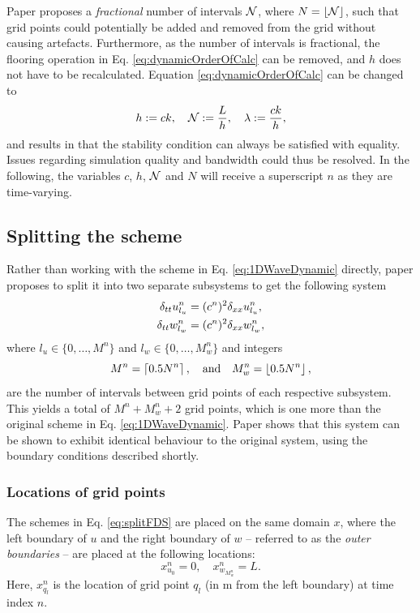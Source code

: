 Paper \citeP[G] proposes a \textit{fractional} number of intervals $\mathcal{N}$, where $N = \floor[\Nfrac]$, such that grid points could potentially be added and removed from the grid without causing artefacts. Furthermore, as the number of intervals is fractional, the flooring operation in Eq. \eqref{eq:dynamicOrderOfCalc} can be removed, and $h$ does not have to be recalculated. Equation \eqref{eq:dynamicOrderOfCalc} can be changed to
\begin{equation}\label{eq:newOrderOfCalc}
    h:= ck, \quad \mathcal{N} := \frac{L}{h}, \quad \lambda := \frac{ck}{h},
\end{equation}  
and results in that the stability condition can always be satisfied with equality. Issues regarding simulation quality and bandwidth could thus be resolved. In the following, the variables $c$, $h$, $\mathcal{N}$ and $N$ will receive a superscript $n$ as they are time-varying.

\subsection{Splitting the scheme}
Rather than working with the scheme in Eq. \eqref{eq:1DWaveDynamic} directly, paper \citeP[G] proposes to split it into two separate subsystems to get the following system 
\begin{subequations}\label{eq:splitFDS}
    \begin{align}
        \delta_{tt} u_{l_u}^n &= (c^n)^2\delta_{xx} u_{l_u}^n,\\
        \delta_{tt} w_{l_w}^n &= (c^n)^2\delta_{xx} w_{l_w}^n,
    \end{align}
\end{subequations}
where $l_u \in \{0, \hdots, M^n\}$ and $l_w \in \{0, \hdots, M_w^n\}$ and integers 
\begin{equation}
    M^n =\ceil[0.5 N^n], \qaq M_w^n =\floor[0.5 N^n],
\end{equation}
are the number of intervals between grid points of each respective subsystem. This yields a total of $M^n + M_w^n + 2$ grid points, which is one more than the original scheme in Eq. \eqref{eq:1DWaveDynamic}. Paper \citeP[G] shows that this system can be shown to exhibit identical behaviour to the original system, using the boundary conditions described shortly.

\subsubsection{Locations of grid points}
The schemes in Eq. \eqref{eq:splitFDS} are placed on the same domain $x$, where the left boundary of $u$ and the right boundary of $w$ -- referred to as the \textit{outer boundaries} -- are placed at the following locations:
\begin{equation}\label{eq:outerBoundaries}
    x_{u_0}^n = 0, \quad x_{w_{M_w^n}}^n = L.
\end{equation}
Here, $x_{q_l}^n$ is the location of grid point $q_l$ (in m from the left boundary) at time index $n$.

